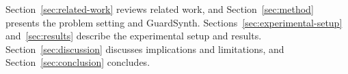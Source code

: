 Section~\ref{sec:related-work} reviews related work, and
Section~\ref{sec:method} presents the problem setting and GuardSynth.
Sections~\ref{sec:experimental-setup} and~\ref{sec:results} describe the
experimental setup and results. Section~\ref{sec:discussion} discusses
implications and limitations, and Section~\ref{sec:conclusion} concludes.
